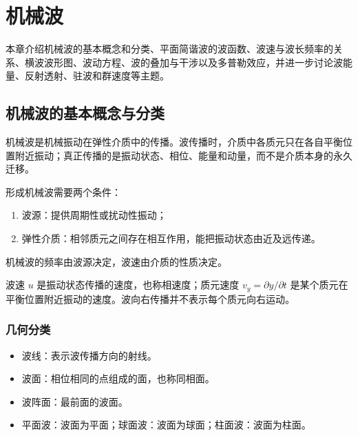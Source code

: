 %
%

\chapter{机械波}

\begin{summary}[本章内容概览]
本章介绍机械波的基本概念和分类、平面简谐波的波函数、波速与波长频率的关系、横波波形图、波动方程、波的叠加与干涉以及多普勒效应，并进一步讨论波能量、反射透射、驻波和群速度等主题。
\end{summary}

\section{机械波的基本概念与分类}

机械波是机械振动在弹性介质中的传播。波传播时，介质中各质元只在各自平衡位置附近振动；真正传播的是振动状态、相位、能量和动量，而不是介质本身的永久迁移。

\begin{definition}[机械波的产生条件]\label{def:mechanical-wave-condition}
形成机械波需要两个条件：
\begin{enumerate}
  \item 波源：提供周期性或扰动性振动；
  \item 弹性介质：相邻质元之间存在相互作用，能把振动状态由近及远传递。
\end{enumerate}
机械波的频率由波源决定，波速由介质的性质决定。
\end{definition}

\begin{attention}[质元速度和波速不是一回事]
波速 $u$ 是振动状态传播的速度，也称相速度；质元速度 $v_y=\partial y/\partial t$ 是某个质元在平衡位置附近振动的速度。波向右传播并不表示每个质元向右运动。
\end{attention}

\subsection*{几何分类}

\begin{itemize}
  \item 波线：表示波传播方向的射线。
  \item 波面：相位相同的点组成的面，也称同相面。
  \item 波阵面：最前面的波面。
  \item 平面波：波面为平面；球面波：波面为球面；柱面波：波面为柱面。
\end{itemize}

